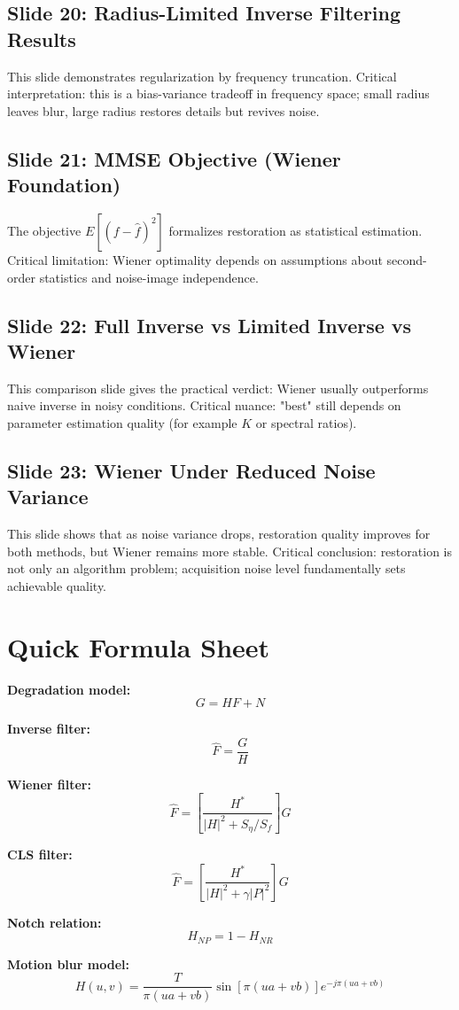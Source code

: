 \documentclass[12pt,a4paper]{article}
\begin{document}
\subsection{Slide 20: Radius-Limited Inverse Filtering Results}
This slide demonstrates regularization by frequency truncation. Critical interpretation: this is a bias-variance tradeoff in frequency space; small radius leaves blur, large radius restores details but revives noise.

\subsection{Slide 21: MMSE Objective (Wiener Foundation)}
The objective $E[(f-\hat{f})^2]$ formalizes restoration as statistical estimation. Critical limitation: Wiener optimality depends on assumptions about second-order statistics and noise-image independence.

\subsection{Slide 22: Full Inverse vs Limited Inverse vs Wiener}
This comparison slide gives the practical verdict: Wiener usually outperforms naive inverse in noisy conditions. Critical nuance: "best" still depends on parameter estimation quality (for example $K$ or spectral ratios).

\subsection{Slide 23: Wiener Under Reduced Noise Variance}
This slide shows that as noise variance drops, restoration quality improves for both methods, but Wiener remains more stable. Critical conclusion: restoration is not only an algorithm problem; acquisition noise level fundamentally sets achievable quality.

\section{Quick Formula Sheet}

\begin{mathbox}
\textbf{Degradation model:}
\[
G=HF+N
\]

\textbf{Inverse filter:}
\[
\hat{F}=\frac{G}{H}
\]

\textbf{Wiener filter:}
\[
\hat{F}=\left[\frac{H^*}{|H|^2+S_\eta/S_f}\right]G
\]

\textbf{CLS filter:}
\[
\hat{F}=\left[\frac{H^*}{|H|^2+\gamma|P|^2}\right]G
\]

\textbf{Notch relation:}
\[
H_{NP}=1-H_{NR}
\]

\textbf{Motion blur model:}
\[
H(u,v)=\frac{T}{\pi(ua+vb)}\sin\left[\pi(ua+vb)\right]e^{-j\pi(ua+vb)}
\]
\end{mathbox}
\end{document}
